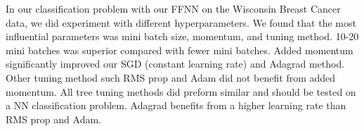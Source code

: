 \begin{comment}
State your main findings and interpretations. 
Try as far as possible to present perspectives for future work. 
Try to discuss the pros and cons of the methods and possible improvements.
\\~\\
Main findings:

    Neural network (regression):
        Sigmoid: Lambda did not play huge role for big learning rates, but for
        small for smaller the MSE got decreased.
        Relu: Not much impact by lambda. Same with leaky.
        
        Now sklearn: Lambda increased, MSE increase for sigmoid. Not much
        effect for relu.

        Overall we see that learning rate plays huge role. But not lambda, for
        regression.
        
Perspectives for future work:
    Sparse network. 

Pros/Cons of methods and possible improvments:
Was the models used good? What worked and what didn't?
    gradient methods: 
        adam optimizer, not good for not noisy data, slow convergence

    neural network regression:
        We used a dense neural network. This could be made sparse
        
    classification:
        use of sigmoid activation for output in classification. Could be replaced
        by softmax for classifying non-binary problems.

Con/improvement: wrong expression for L2-parameter.
    


\end{comment}


In our classification problem with our FFNN on the Wisconsin Breast Cancer
data, we did experiment with different hyperparameters. We found that the most
influential parameters was mini batch size, momentum, and tuning method.  
10-20 mini batches was superior compared with fewer mini batches. Added
momentum significantly improved our SGD (constant learning rate) and
Adagrad method. Other tuning method such RMS prop and Adam did not benefit from
added momentum. All tree tuning methods did preform similar and should be tested on a NN classification
problem. Adagrad benefits from a higher learning rate than RMS prop and Adam.    

